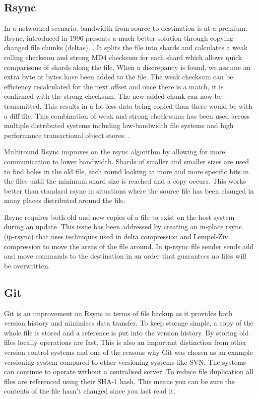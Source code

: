 \documentclass[11pt, a4paper, twoside]{report}
\begin{document}
\subsection{Rsync}
In a networked scenario, bandwidth from source to destination is at a premium. Rsync, introduced in 1996 presents a much better solution through copying changed file chunks (deltas). \citep{tridgell1996rsync}. It splits the file into shards and calculates a weak rolling checksum and strong MD4 checksum for each shard which allows quick comparisons of shards along the file. When a discrepancy is found, we assume an extra byte or bytes have been added to the file. The weak checksum can be efficiency recalculated for the next offset and once there is a match, it is confirmed with the strong checksum. The new added chunk can now be transmitted. This results in a lot less data being copied than there would be with a diff file. \citep{tridgell1996rsync} This combination of weak and strong check-sums has been used across multiple distributed systems including low-bandwidth file systems \citep{muthitacharoen2001low} and high performance transactional object stores. \citep{stephen2000platypus}.

Multiround Rsync improves on the rsync algorithm by allowing for more communication to lower bandwidth. Shards of smaller and smaller sizes are used to find holes in the old file, each round looking at more and more specific bits in the files until the minimum shard size is reached and a copy occurs. \citep{multiroundrsync} This works better than standard rsync in situations where the source file has been changed in many places distributed around the file.

Rsync requires both old and new copies of a file to exist on the host system during an update. This issue has been addressed by creating an in-place rsync (ip-rsync) that uses techniques used in delta compression and Lempel-Ziv compression to move the areas of the file around. In ip-rsync file sender sends add and move commands to the destination in an order that guarantees no files will be overwritten. \citep{rasch2003place}

\subsection{Git}

Git is an improvement on Rsync in terms of file backup as it provides both version history and minimises data transfer. To keep storage simple, a copy of the whole file is stored and a reference is put into the version history. By storing old files locally operations are fast. This is also an important distinction from other version control systems and one of the reasons why Git was chosen as an example versioning system compared to other versioning systems like SVN. The systems can continue to operate without a centralised server. To reduce file duplication all files are referenced using their SHA-1 hash. This means you can be sure the contents of the file hasn’t changed since you last read it. \citep{torvalds2010git}
\end{document}
